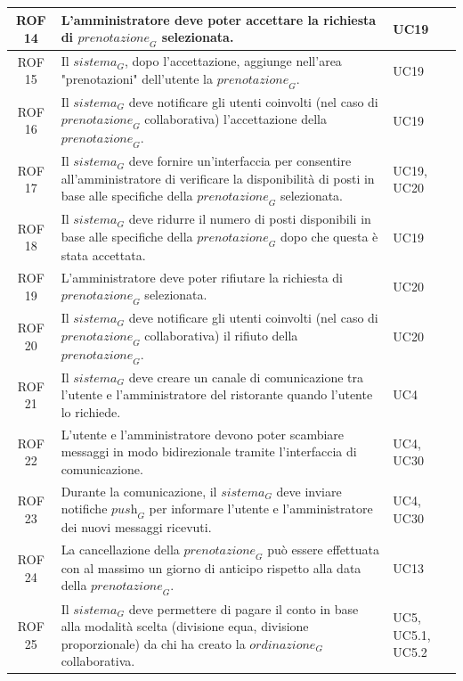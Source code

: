 \documentclass[12pt, oneside]{article}
\begin{document}
\begin{longtable}{|c|p{14cm}|p{2cm}|}
    \hline
    ROF 14& L'amministratore deve poter accettare la richiesta di $\textit{prenotazione}_G$ selezionata. & UC19 \\
    \hline
    ROF 15& Il $\textit{sistema}_G$, dopo l'accettazione, aggiunge nell'area "prenotazioni" dell'utente la $\textit{prenotazione}_G$. & UC19 \\
    \hline
    ROF 16& Il $\textit{sistema}_G$ deve notificare gli utenti coinvolti (nel caso di $\textit{prenotazione}_G$ collaborativa) l'accettazione della $\textit{prenotazione}_G$. & UC19 \\
    \hline
    ROF 17& Il $\textit{sistema}_G$ deve fornire un'interfaccia per consentire all'amministratore di verificare la disponibilità di posti in base alle specifiche della $\textit{prenotazione}_G$ selezionata. & UC19, UC20 \\
    \hline
    ROF 18& Il $\textit{sistema}_G$ deve ridurre il numero di posti disponibili in base alle specifiche della $\textit{prenotazione}_G$ dopo che questa è stata accettata. & UC19 \\
    \hline
    ROF 19& L'amministratore deve poter rifiutare la richiesta di $\textit{prenotazione}_G$ selezionata. & UC20 \\
    \hline
    ROF 20& Il $\textit{sistema}_G$ deve notificare gli utenti coinvolti (nel caso di $\textit{prenotazione}_G$ collaborativa) il rifiuto della $\textit{prenotazione}_G$. & UC20 \\
    \hline
    ROF 21& Il $\textit{sistema}_G$ deve creare un canale di comunicazione tra l'utente e l'amministratore del ristorante quando l'utente lo richiede. & UC4 \\
    \hline
    ROF 22& L'utente e l'amministratore devono poter scambiare messaggi in modo bidirezionale tramite l'interfaccia di comunicazione. & UC4, UC30 \\
    \hline
    ROF 23& Durante la comunicazione, il $\textit{sistema}_G$ deve inviare notifiche $\textit{push}_G$ per informare l'utente e l'amministratore dei nuovi messaggi ricevuti. & UC4, UC30 \\
    \hline
    ROF 24&  La cancellazione della $\textit{prenotazione}_G$ può essere effettuata con al massimo un giorno di anticipo rispetto alla data della $\textit{prenotazione}_G$.  & UC13 \\ 
    \hline
    ROF 25& Il $\textit{sistema}_G$ deve permettere di pagare il conto in base alla modalità scelta (divisione equa, divisione proporzionale) da chi ha creato la $\textit{ordinazione}_G$ collaborativa. & UC5, UC5.1, UC5.2 \\

\end{longtable}
\end{document}
